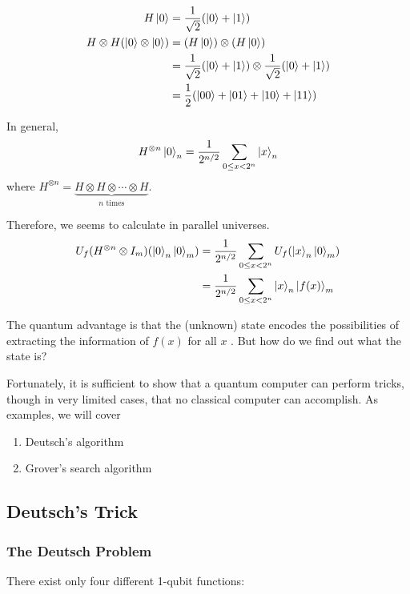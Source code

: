 \begin{align*}
    H\ket{0}&=\frac{1}{\sqrt{2}}(\ket{0}+\ket{1})\\
    H\otimes H(\ket{0}\otimes \ket{0})&=(H\ket{0})\otimes(H\ket{0})\\
    &=\frac{1}{\sqrt{2}}(\ket{0}+\ket{1})\otimes\frac{1}{\sqrt{2}}(\ket{0}+\ket{1})\\
    &=\frac{1}{2}(\ket{00}+\ket{01}+\ket{10}+\ket{11})
\end{align*}

In general, 
\begin{align*}
    H^{\otimes n}\ket{0}_n=\frac{1}{2^{n/2}}\sum_{0\le x<2^n}\ket{x}_n
\end{align*}
where $H^{\otimes n}=\underbrace{H\otimes H\otimes \cdots \otimes H}_{n\text{ times}}$.

Therefore, we seems to calculate in parallel universes.
\begin{align*}
    U_f(H^{\otimes n}\otimes I_m)(\ket{0}_n\ket{0}_m)&=\frac{1}{2^{n/2}}\sum_{0\le x <2^n}U_f(\ket{x}_n\ket{0}_m)\\
    &=\frac{1}{2^{n/2}}\sum_{0\le x <2^n}\ket{x}_n\ket{f(x)}_m
\end{align*}

The quantum advantage is that the (unknown) state encodes the possibilities of extracting the information of $f(x )$ for all $x$ . But how do we find out what the state is? 

Fortunately, it is sufficient to show that a quantum computer can perform tricks, though in very limited cases, that no classical computer can accomplish. As examples, we will cover
\begin{enumerate}\small
    \item Deutsch's algorithm
    \item Grover's search algorithm
\end{enumerate}

\subsection{Deutsch's Trick}
\subsubsection{The Deutsch Problem}
There exist only four different 1-qubit functions:
\begin{figure}[H]
    \centering
\end{figure}

